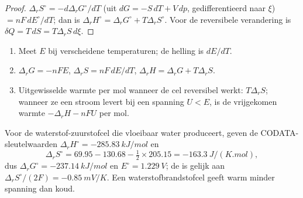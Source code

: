 \begin{proof}
$\Delta_r S^\circ = -d\Delta_r G^\circ/dT$ (uit $dG = -S\,dT + V\,dp$, gedifferentieerd
naar $\xi$) $= nF\,dE^\circ/dT$; dan is $\Delta_r H^\circ = \Delta_r G^\circ
+ T\Delta_r S^\circ$. Voor de reversibele verandering is $\delta Q = T\,dS = T\Delta_r S\,
d\xi$.
\end{proof}

\begin{method}\label{met:b2:cell-thermodynamics:cell-data}
\begin{enumerate}
  \item Meet $E$ bij verscheidene temperaturen; de helling is $dE/dT$.
  \item $\Delta_r G = -nFE$, $\Delta_r S = nF\,dE/dT$, $\Delta_r H = \Delta_r G +
        T\Delta_r S$.
  \item Uitgewisselde warmte per mol wanneer de cel reversibel werkt: $T\Delta_r S$;
        wanneer ze een stroom levert bij een spanning $U < E$, is de vrijgekomen warmte
        $-\Delta_r H - nFU$ per mol.
\end{enumerate}
\end{method}

Voor de waterstof-zuurstofcel die vloeibaar water produceert, geven de CODATA-sleutelwaarden
$\Delta_r H^\circ = \qty{-285.83}{kJ/mol}$ en
\[
  \Delta_r S^\circ = 69.95 - 130.68 - \tfrac12 \times 205.15 = \qty{-163.3}{J/(K.mol)} ,
\]
dus $\Delta_r G^\circ = \qty{-237.14}{kJ/mol}$ en $E^\circ = \qty{1.229}{V}$; de
 is gelijk aan $\Delta_r S^\circ/(2F) = \qty{-0.85}{mV/K}$. Een waterstofbrandstofcel geeft warm
minder spanning dan koud.

